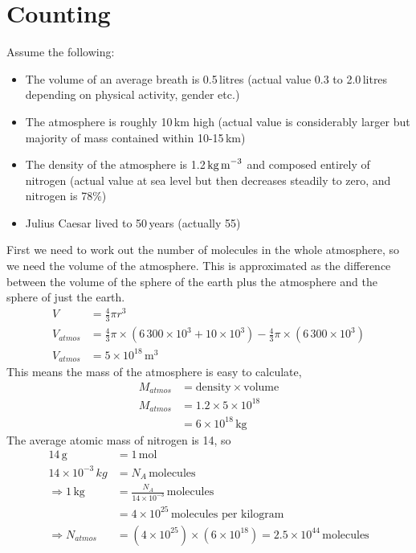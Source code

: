 \section{Counting}
Assume the following:
\begin{itemize}
	\item The volume of an average breath is 0.5\,litres (actual value 0.3 to 2.0\,litres depending on physical activity, gender etc.)
	\item The atmosphere is roughly 10\,km high (actual value is considerably larger but majority of mass contained within 10-15\,km)
	\item The density of the atmosphere is 1.2\,$\text{kg\,m}^{-3}$ and composed entirely of nitrogen (actual value at sea level but then decreases steadily to zero, and nitrogen is 78\%)
	\item Julius Caesar lived to 50\,years (actually 55)
\end{itemize}
First we need to work out the number of molecules in the whole atmosphere, so we need the volume of the atmosphere. This is approximated as the difference between the volume of the sphere of the earth plus the atmosphere and the sphere of just the earth.
\begin{align*}
	V &= \frac{4}{3}\pi r^3 \\
	V_{atmos} &= \frac{4}{3}\pi \times (6\,300\times10^3 + 10\times10^3) - \frac{4}{3}\pi \times (6\,300\times10^3) \\
	V_{atmos} &= 5\times10^{18}\,\text{m}^3
\end{align*}
This means the mass of the atmosphere is easy to calculate,
\begin{align*}
	M_{atmos} &= \text{density} \times \text{volume} \\
	M_{atmos} &= 1.2 \times 5\times10^{18} \\
	&= 6\times10^{18}\,\text{kg} 
\end{align*}
The average atomic mass of nitrogen is 14, so
\begin{align*}
	14\,\text{g} &= 1\,\text{mol} \\
	14\times10^{-3}\,kg &= N_A\, \text{molecules} \\
	\Rightarrow 1\,\text{kg} &= \frac{N_A}{14\times10^{-3}}\, \text{molecules} \\
	&= 4\times10^{25}\, \text{molecules per kilogram} \\
	\Rightarrow N_{atmos} &= (4\times10^{25}) \times (6\times10^{18}) = 2.5\times10^{44}\, \text{molecules}
\end{align*}

